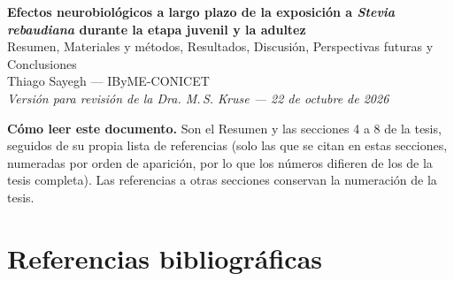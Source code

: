\documentclass[12pt,a4paper,oneside]{report}
\begin{document}

\begin{center}
  {\Large\textbf{Efectos neurobiológicos a largo plazo de la exposición a \textit{Stevia rebaudiana} durante la etapa juvenil y la adultez}}\\[0.8em]
  {\large Resumen, Materiales y métodos, Resultados, Discusión, Perspectivas futuras y Conclusiones}\\[0.6em]
  Thiago Sayegh --- IByME-CONICET\\[0.3em]
  \textit{Versión para revisión de la Dra. M.\,S. Kruse --- 22 de octubre de 2026}
\end{center}

\vspace{0.8em}
\noindent\textbf{Cómo leer este documento.} Son el Resumen y las secciones 4 a 8 de la tesis, seguidos de su propia lista de referencias (solo las que se citan en estas secciones, numeradas por orden de aparición, por lo que los números difieren de los de la tesis completa). Las referencias a otras secciones conservan la numeración de la tesis.



\clearpage
\setcounter{chapter}{3}






\chapter*{Referencias bibliográficas}
\printbibliography[heading=none]
\end{document}
